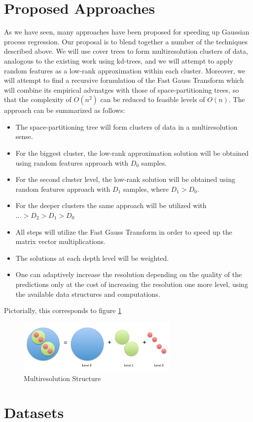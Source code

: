 \documentclass{article}
\begin{document}
\section{Proposed Approaches}
As we have seen, many approaches have been proposed for speeding up Gaussian process regression. Our proposal is to blend together a number of the techniques described above. We will use cover trees to form multiresolution clusters of data, analogous to the existing work using kd-trees, and we will attempt to apply random features as a low-rank approximation within each cluster. Moreover, we will attempt to find a recursive formulation of the Fast Gauss Transform which will combine its empirical advnatges with those of space-partitioning trees, so that the complexity of $O(n^2)$ can be reduced to feasible levels of $O(n)$. The approach can be summarized as follows:
\begin{itemize}
\item The space-partitioning tree will form clusters of data in a multiresolution sense.
\item For the biggest cluster, the low-rank approximation solution will be obtained using random features approach with $D_0$ samples.
\item For the second cluster level, the low-rank solution will be obtained using random features approach with $D_1$ samples, where $D_1>D_0$.
\item For the deeper clusters the same approach will be utilized with $\dots>D_2>D_1>D_0$
\item All steps will utilize the Fast Gauss Transform in order to speed up the matrix vector multiplications.
\item The solutions at each depth level will be weighted.
\item One can adaptively increase the resolution depending on the quality of the predictions only at the cost of increasing the resolution one more level, using the available data structures and computations.
\end{itemize}
Pictorially, this corresponds to figure \ref{fig:multiresolution}
\begin{figure}[h!] \label{fig:multiresolution}
  \caption{Multiresolution Structure}
  \centering
    \includegraphics[width=0.7\textwidth]{multiresolution}
\end{figure}
\section{Datasets}



\newpage


\end{document}
